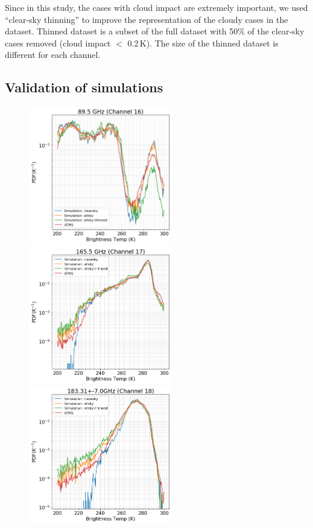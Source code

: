 \documentclass[12pt]{article}
\begin{document}
Since in this study, the cases with cloud impact are extremely important, we used ``clear-sky thinning'' to improve the representation of the cloudy cases in the dataset. Thinned dataset is a subset of the full dataset with 50\% of the clear-sky cases removed (cloud impact $<$ 0.2\,K). The size of the thinned dataset is different for each channel. 

\subsection{Validation of simulations}
\label{sec:validation}
%
\begin{figure}[p]
	\centering
	\includegraphics[height=60mm]{ATMS_C16_distribution}\hspace{5mm}%
	\includegraphics[height=60mm]{ATMS_C17_distribution}
	\includegraphics[height=60mm]{ATMS_C18_distribution}\hspace{5mm}%

\end{figure}
\end{document}

